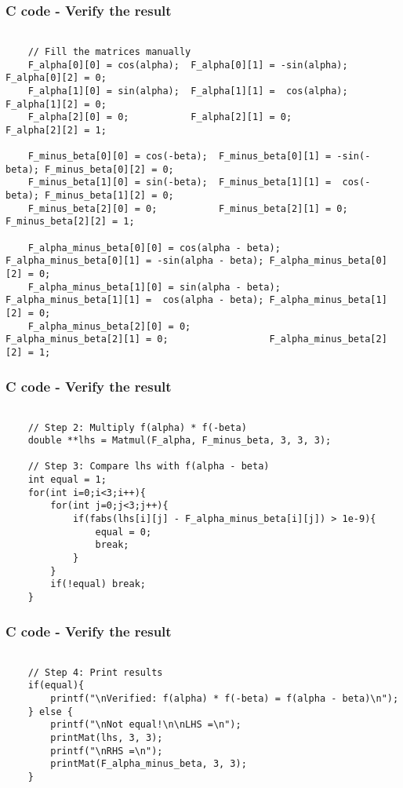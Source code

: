 \documentclass{beamer}
\begin{document}
\begin{frame}[fragile]                            
\frametitle{C code - Verify the result}                
\begin{lstlisting}

    // Fill the matrices manually
    F_alpha[0][0] = cos(alpha);  F_alpha[0][1] = -sin(alpha); F_alpha[0][2] = 0;
    F_alpha[1][0] = sin(alpha);  F_alpha[1][1] =  cos(alpha); F_alpha[1][2] = 0;
    F_alpha[2][0] = 0;           F_alpha[2][1] = 0;           F_alpha[2][2] = 1;

    F_minus_beta[0][0] = cos(-beta);  F_minus_beta[0][1] = -sin(-beta); F_minus_beta[0][2] = 0;
    F_minus_beta[1][0] = sin(-beta);  F_minus_beta[1][1] =  cos(-beta); F_minus_beta[1][2] = 0;
    F_minus_beta[2][0] = 0;           F_minus_beta[2][1] = 0;           F_minus_beta[2][2] = 1;

    F_alpha_minus_beta[0][0] = cos(alpha - beta);  F_alpha_minus_beta[0][1] = -sin(alpha - beta); F_alpha_minus_beta[0][2] = 0;
    F_alpha_minus_beta[1][0] = sin(alpha - beta);  F_alpha_minus_beta[1][1] =  cos(alpha - beta); F_alpha_minus_beta[1][2] = 0;
    F_alpha_minus_beta[2][0] = 0;                  F_alpha_minus_beta[2][1] = 0;                  F_alpha_minus_beta[2][2] = 1;
\end{lstlisting}
\end{frame}

\begin{frame}[fragile]                            
\frametitle{C code - Verify the result}                
\begin{lstlisting}

    // Step 2: Multiply f(alpha) * f(-beta)
    double **lhs = Matmul(F_alpha, F_minus_beta, 3, 3, 3);

    // Step 3: Compare lhs with f(alpha - beta)
    int equal = 1;
    for(int i=0;i<3;i++){
        for(int j=0;j<3;j++){
            if(fabs(lhs[i][j] - F_alpha_minus_beta[i][j]) > 1e-9){
                equal = 0;
                break;
            }
        }
        if(!equal) break;
    }
\end{lstlisting}
\end{frame}

\begin{frame}[fragile]                            
\frametitle{C code - Verify the result}                
\begin{lstlisting}

    // Step 4: Print results
    if(equal){
        printf("\nVerified: f(alpha) * f(-beta) = f(alpha - beta)\n");
    } else {
        printf("\nNot equal!\n\nLHS =\n");
        printMat(lhs, 3, 3);
        printf("\nRHS =\n");
        printMat(F_alpha_minus_beta, 3, 3);
    }
\end{lstlisting}
\end{frame}
\end{document}
